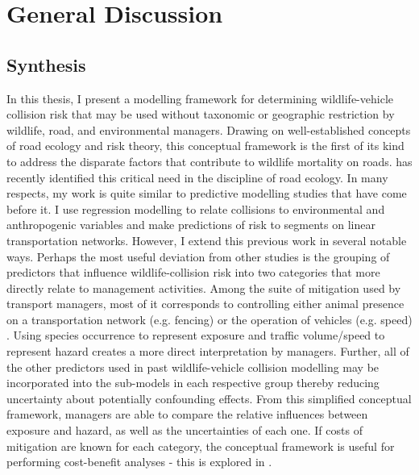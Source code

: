 \chapter{General Discussion}\label{sec:conc}
\newpage

\section{Synthesis}

In this thesis, I present a modelling framework for determining wildlife-vehicle collision risk that may be used without taxonomic or geographic restriction by wildlife, road, and environmental managers. Drawing on well-established concepts of road ecology and risk theory, this conceptual framework is the first of its kind to address the disparate factors that contribute to wildlife mortality on roads. \cite{clev15} has recently identified this critical need in the discipline of road ecology. In many respects, my work is quite similar to predictive modelling studies that have come before it. I use regression modelling to relate collisions to environmental and anthropogenic variables and make predictions of risk to segments on linear transportation networks. However, I extend this previous work in several notable ways. Perhaps the most useful deviation from other studies is the grouping of predictors that influence wildlife-collision risk into two categories that more directly relate to management activities. Among the suite of mitigation used by transport managers, most of it corresponds to controlling either animal presence on a transportation network (e.g. fencing) or the operation of vehicles (e.g. speed) \citep{}.  Using species occurrence to represent exposure and traffic volume/speed to represent hazard creates a more direct interpretation by managers. Further, all of the other predictors used in past wildlife-vehicle collision modelling may be incorporated into the sub-models in each respective group thereby reducing uncertainty about potentially confounding effects. From this simplified conceptual framework, managers are able to compare the relative influences between exposure and hazard, as well as the uncertainties of each one. If costs of mitigation are known for each category, the conceptual framework is useful for performing cost-benefit analyses - this is explored in .

